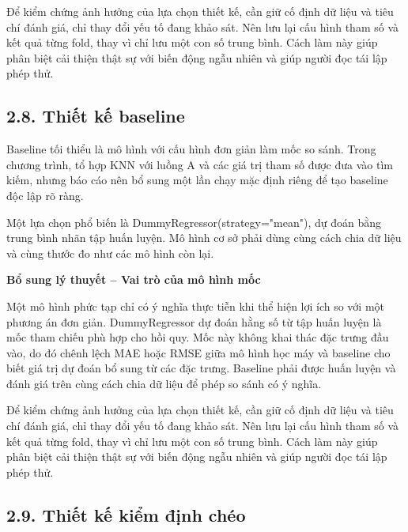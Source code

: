 \documentclass[12pt,a4paper,oneside]{article}
\begin{document}
Để kiểm chứng ảnh hưởng của lựa chọn thiết kế, cần giữ cố định dữ liệu và tiêu chí đánh giá, chỉ thay đổi yếu tố đang khảo sát. Nên lưu lại cấu hình tham số và kết quả từng fold, thay vì chỉ lưu một con số trung bình. Cách làm này giúp phân biệt cải thiện thật sự với biến động ngẫu nhiên và giúp người đọc tái lập phép thử.\par

\subsection*{2.8. Thiết kế baseline}

Baseline tối thiểu là mô hình với cấu hình đơn giản làm mốc so sánh.
Trong chương trình, tổ hợp KNN với luồng A và các giá trị tham số được
đưa vào tìm kiếm, nhưng báo cáo nên bổ sung một lần chạy mặc định riêng
để tạo baseline độc lập rõ ràng.

Một lựa chọn phổ biến là DummyRegressor(strategy="mean"), dự đoán bằng
trung bình nhãn tập huấn luyện. Mô hình cơ sở phải dùng cùng cách chia
dữ liệu và cùng thước đo như các mô hình còn lại.


\par\noindent\textbf{Bổ sung lý thuyết -- Vai trò của mô hình mốc}\par
Một mô hình phức tạp chỉ có ý nghĩa thực tiễn khi thể hiện lợi ích so với một phương án đơn giản. DummyRegressor dự đoán hằng số từ tập huấn luyện là mốc tham chiếu phù hợp cho hồi quy. Mốc này không khai thác đặc trưng đầu vào, do đó chênh lệch MAE hoặc RMSE giữa mô hình học máy và baseline cho biết giá trị dự đoán bổ sung từ các đặc trưng. Baseline phải được huấn luyện và đánh giá trên cùng cách chia dữ liệu để phép so sánh có ý nghĩa.\par

Để kiểm chứng ảnh hưởng của lựa chọn thiết kế, cần giữ cố định dữ liệu và tiêu chí đánh giá, chỉ thay đổi yếu tố đang khảo sát. Nên lưu lại cấu hình tham số và kết quả từng fold, thay vì chỉ lưu một con số trung bình. Cách làm này giúp phân biệt cải thiện thật sự với biến động ngẫu nhiên và giúp người đọc tái lập phép thử.\par

\subsection*{2.9. Thiết kế kiểm định chéo}
\end{document}
